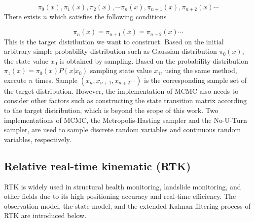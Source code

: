 \documentclass{svjour3}                     %
\begin{document}
\begin{equation}\label{eq_markov_chain_2}
\pi_{0}(x),\pi_{1}(x),\pi_{2}(x),\cdots \pi_{n}(x),\pi_{n+1}(x),\pi_{n+2}(x)\cdots
\end{equation}
There exists $n$ which satisfies the following conditions

\begin{equation}\label{eq_markov_chain_3}
\pi_{n}(x)=\pi_{n+1}(x)=\pi_{n+2}(x)\cdots
\end{equation}
This is the target distribution we want to construct. Based on the initial arbitrary simple probability distribution such as Gaussian distribution $\pi_{0}(x)$, the state value $x_0$ is obtained by sampling. Based on the probability distribution $\pi_{1}(x)=\pi_{0}(x)P(x\left| {{x_0}} \right.)$ sampling state value $x_1$, using the same method, execute $n$ times. Sample $(x_{n},x_{n+1},x_{n+2}\cdots)$ is the corresponding sample set of the target distribution. However, the implementation of MCMC also needs to consider other factors such as constructing the state transition matrix according to the target distribution, which is beyond the scope of this work. Two implementations of MCMC,  the Metropolis-Hasting sampler\citep{chib1995understanding} and the No-U-Turn sampler\citep{hoffman2014no}, are used to sample discrete random variables and continuous random variables, respectively.

\subsection{Relative real-time kinematic (RTK)}
RTK is widely used in structural health monitoring, landslide monitoring, and other fields due to its high positioning accuracy and real-time efficiency. The observation model, the state model, and the extended Kalman filtering process of RTK are introduced below. 
\end{document}

